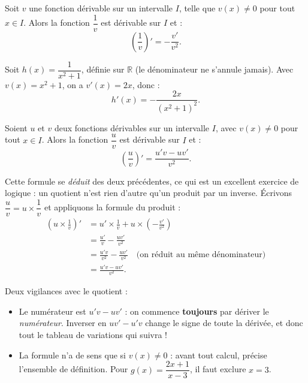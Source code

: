 \documentclass[11pt]{article}
\begin{document}
\begin{propriete}
Soit $v$ une fonction dérivable sur un intervalle $I$, telle que $v(x) \neq 0$ pour tout $x \in I$. Alors la fonction $\dfrac{1}{v}$ est dérivable sur $I$ et :
\[ \left(\frac{1}{v}\right)' = -\frac{v'}{v^2}. \]
\end{propriete}

\begin{exemplebox}
Soit $h(x) = \dfrac{1}{x^2 + 1}$, définie sur $\mathbb{R}$ (le dénominateur ne s'annule jamais). Avec $v(x) = x^2+1$, on a $v'(x) = 2x$, donc :
\[ h'(x) = -\frac{2x}{(x^2+1)^2}. \]
\end{exemplebox}

\begin{propriete}
Soient $u$ et $v$ deux fonctions dérivables sur un intervalle $I$, avec $v(x) \neq 0$ pour tout $x \in I$. Alors la fonction $\dfrac{u}{v}$ est dérivable sur $I$ et :
\[ \left(\frac{u}{v}\right)' = \frac{u'v - uv'}{v^2}. \]
\end{propriete}

Cette formule se \emph{déduit} des deux précédentes, ce qui est un excellent exercice de logique : un quotient n'est rien d'autre qu'un produit par un inverse. Écrivons $\dfrac{u}{v} = u \times \dfrac{1}{v}$ et appliquons la formule du produit :
\begin{align*}
\left(u \times \frac{1}{v}\right)' &= u' \times \frac{1}{v} + u \times \left(-\frac{v'}{v^2}\right) \\
&= \frac{u'}{v} - \frac{uv'}{v^2} \\
&= \frac{u'v}{v^2} - \frac{uv'}{v^2} \quad \text{(on réduit au même dénominateur)} \\
&= \frac{u'v - uv'}{v^2}.
\end{align*}

\begin{attention}
Deux vigilances avec le quotient :
\begin{itemize}
\item Le numérateur est $u'v - uv'$ : on commence \textbf{toujours} par dériver le \emph{numérateur}. Inverser en $uv' - u'v$ change le signe de toute la dérivée, et donc tout le tableau de variations qui suivra !
\item La formule n'a de sens que si $v(x) \neq 0$ : avant tout calcul, précise l'ensemble de définition. Pour $g(x) = \dfrac{2x+1}{x-3}$, il faut exclure $x = 3$.
\end{itemize}
\end{attention}
\end{document}
